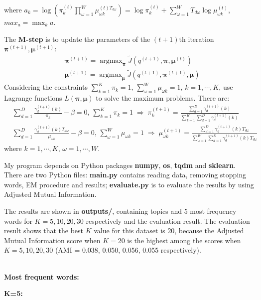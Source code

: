 \documentclass[12pt]{article}
\begin{document}
where $a_k=\log\left(\pi_k^{(t)}\prod_{\omega=1}^W\mu_{\omega k}^{(t)T_{d\omega}}\right)=\log\pi_k^{(t)}+\sum_{\omega=1}^W T_{d\omega}\log\mu_{\omega k}^{(t)}$, $max_a=\max_{k}a$.

The {\bf M-step} is to update the parameters of the $(t+1)$th iteration $\bm{\pi}^{(t+1)},\bm{\mu}^{(t+1)}$:
\begin{align*}
&\bm{\pi}^{(t+1)}=\mathop{\arg\max}_{\bm{\pi}}\tilde{J}\left(q^{(t+1)},\bm{\pi},\bm{\mu}^{(t)}\right)\\
&\bm{\mu}^{(t+1)}=\mathop{\arg\max}_{\bm{\mu}}\tilde{J}\left(q^{(t+1)},\bm{\pi}^{(t+1)},\bm{\mu}\right)
\end{align*}
Considering the constraints $\sum_{k=1}^K\pi_k=1,\,\sum_{\omega=1}^W\mu_{\omega k}=1,\,k=1,\cdots,K$, use Lagrange functions $L(\bm{\pi},\bm{\mu})$ to solve the maximum problems. There are:
\begin{align*}
&\sum_{d=1}^D\frac{\gamma_d^{(t+1)}(k)}{\pi_k}-\beta=0,\,\sum_{k=1}^K\pi_k=1\;\Rightarrow\;
\pi_k^{(t+1)}=\frac{\sum_{d=1}^D\gamma_d^{(t+1)}(k)}{\sum_{k=1}^K\sum_{d=1}^D\gamma_d^{(t+1)}(k)}\\
&\sum_{d=1}^D\frac{\gamma_d^{(t+1)}(k)T_{d\omega}}{\mu_{\omega k}}-\beta=0,\,\sum_{\omega=1}^W\mu_{\omega k}=1\;\Rightarrow\;\mu_{\omega k}^{(t+1)}=\frac{\sum_{d=1}^D\gamma_d^{(t+1)}(k)T_{d\omega}}{\sum_{\omega=1}^W\sum_{d=1}^D\gamma_d^{(t+1)}(k)T_{d\omega}}
\end{align*}
where $k=1,\cdots,K$, $\omega=1,\cdots,W$.
\par
My program depends on Python packages {\bf numpy}, {\bf os}, {\bf tqdm} and {\bf sklearn}. There are two Python files: {\bf main.py} contains reading data, removing stopping words, EM procedure and results; {\bf evaluate.py} is to evaluate the results by using Adjusted Mutual Information. 
\par
The results are shown in {\bf outputs/}, containing topics and 5 most frequency words for $K=5,10,20,30$ respectively and the evaluation result. The evaluation result shows that the best $K$ value for this dataset is $20$, because the Adjusted Mutual Information score when $K=20$ is the highest among the scores when $K=5,10,20,30$ (AMI = 0.038, 0.050, 0.056, 0.055 respectively). 
\par
~\\
{\bf Most frequent words:}
\par
{\bf K=5:}
\end{document}

